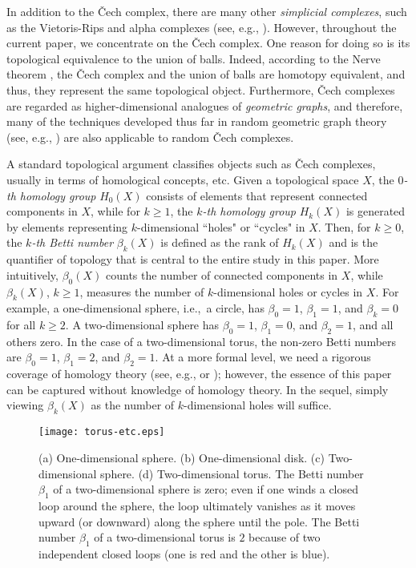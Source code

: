 \documentclass[11pt]{amsart}
\numberwithin{equation}{section}
\theoremstyle{plain}
\theoremstyle{definition}
\begin{document}
In addition to the \v{C}ech complex, there are many other \textit{simplicial complexes}, such as the Vietoris-Rips and alpha complexes (see, e.g., \cite{ghrist:2014}). However, throughout the current paper, we concentrate on the \v{C}ech complex. One reason for doing so is its topological equivalence to the union of balls. Indeed, according to the Nerve theorem \cite{borsuk:1948}, the \v{C}ech complex and the union of balls are homotopy equivalent, and thus, they represent the same topological object. Furthermore, \v{C}ech complexes are regarded as higher-dimensional analogues of \textit{geometric graphs}, and therefore, many of the techniques developed thus far in random geometric graph theory (see, e.g., \cite{penrose:2003}) are also applicable to random \v{C}ech complexes.

A standard topological argument classifies objects such as \v{C}ech complexes, usually in terms of homological concepts, etc. Given a topological space $X$, the \textit{$0$-th homology group} $H_0(X)$ consists of elements that represent connected components in $X$, while for $k \geq 1$, the \textit{$k$-th homology group} $H_k(X)$ is generated by elements representing $k$-dimensional ``holes" or ``cycles" in $X$. Then, for $k \geq 0$, the \textit{$k$-th Betti number} $\beta_k(X)$ is defined as the rank of $H_k(X)$ and is the quantifier of topology that is central
 to the entire study in this paper. 
 More intuitively, $\beta_0(X)$ counts the number of connected components in $X$, while $\beta_k(X)$, $k \geq 1$, measures the number of $k$-dimensional holes or cycles in $X$. For example, a one-dimensional sphere, i.e.,\ a circle, has $\beta_0=1$, $\beta_1=1$,  and $\beta_k=0$ for all $k\geq 2$. A two-dimensional sphere has $\beta_0=1$, $\beta_1=0$, and $\beta_2=1$,  and all others  zero. In the case of a two-dimensional torus, the non-zero Betti numbers are  $\beta_0=1$, $\beta_1=2$, and $\beta_2=1$. At a more formal level, we need a rigorous coverage of homology theory (see, e.g., \cite{hatcher:2002} or \cite{vick:1994}); however, the essence of this paper can be captured without knowledge of homology theory. In the sequel, simply viewing $\beta_k(X)$ as the number of $k$-dimensional holes will suffice.
\begin{figure}[!t]
\begin{center}
\texttt{[image: torus-etc.eps]}
\caption{{\footnotesize (a) One-dimensional sphere. (b) One-dimensional disk. (c) Two-dimensional sphere. (d) Two-dimensional torus. The Betti number $\beta_1$ of a two-dimensional sphere is zero; even if one winds a closed loop around the sphere, the loop ultimately vanishes as it moves upward (or downward) along the sphere until the pole. The Betti number $\beta_1$ of a two-dimensional torus is $2$ because of two independent closed loops (one is red and the other is blue). }}
\end{center}
\end{figure}
\end{document}
